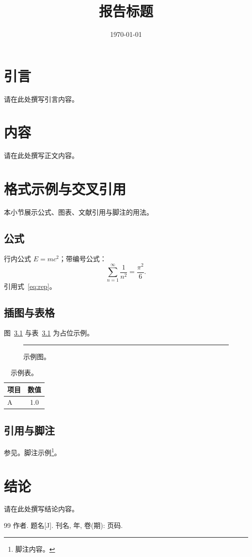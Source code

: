 \documentclass{report}
\title{报告标题}
\author{}
\date{\today}
\begin{document}
\maketitle

\chapter{引言}
请在此处撰写引言内容。

\chapter{内容}
请在此处撰写正文内容。

\chapter{格式示例与交叉引用}
本小节展示公式、图表、文献引用与脚注的用法。

\section{公式}
行内公式 $E=mc^2$；带编号公式：
\begin{equation}
  \label{eq:rep}
  \sum_{n=1}^{\infty} \frac{1}{n^2} = \frac{\pi^2}{6}.
\end{equation}
引用式~\ref{eq:rep}。

\section{插图与表格}
图~\ref{fig:rep} 与表~\ref{tab:rep} 为占位示例。
\begin{figure}[htbp]
  \centering
  \rule{4cm}{2.5cm}
  \caption{示例图。}
  \label{fig:rep}
\end{figure}

\begin{table}[htbp]
  \centering
  \caption{示例表。}
  \label{tab:rep}
  \begin{tabular}{lc}
    \toprule
    项目 & 数值 \\
    \midrule
    A    & 1.0  \\
    \bottomrule
  \end{tabular}
\end{table}

\section{引用与脚注}
参见\cite{ref1}。脚注示例\footnote{脚注内容。}。

\chapter{结论}
请在此处撰写结论内容。

\begin{thebibliography}{99}
 作者. 题名[J]. 刊名, 年, 卷(期): 页码.
\end{thebibliography}
\end{document}
